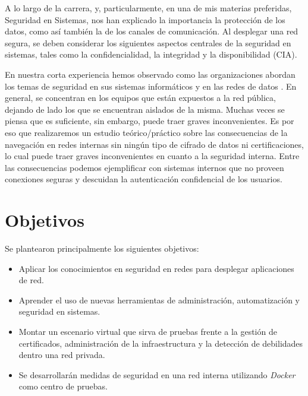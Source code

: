 %


A lo largo de la carrera, y, particularmente, en una de mis materias preferidas,  
Seguridad en Sistemas, nos han explicado la importancia la protección de los 
datos, como así también la de los canales de comunicación. Al desplegar 
una red segura, se deben considerar los siguientes aspectos centrales de la 
seguridad en sistemas, tales como la confidencialidad, la integridad y la disponibilidad 
(CIA). 

En nuestra corta experiencia hemos observado como las organizaciones 
abordan los temas de seguridad en sus sistemas informáticos y en las redes de 
datos . En general, se 
concentran en los equipos que están expuestos a la red pública, dejando de 
lado los que se encuentran aislados de la misma. Muchas veces 
se piensa que es suficiente, sin embargo, puede traer graves inconvenientes. 
Es por eso que realizaremos un estudio teórico/práctico sobre las consecuencias 
de la navegación en redes internas sin ningún tipo de cifrado de datos ni 
certificaciones, lo cual puede traer graves inconvenientes en cuanto a la 
seguridad interna. Entre las consecuencias podemos ejemplificar con sistemas 
internos que no proveen conexiones seguras y descuidan la autenticación 
confidencial de los usuarios.


\section{Objetivos}

\noindent Se plantearon principalmente los siguientes objetivos:
\begin{itemize}
    \setlength\itemsep{-0.6em}
    \item Aplicar los conocimientos en seguridad en redes para desplegar aplicaciones de red.
    \item Aprender el uso de nuevas herramientas de administración, automatización y seguridad en sistemas.
    \item Montar un escenario virtual que sirva de pruebas frente a la gestión de certificados, 
    administración de la infraestructura y la detección de debilidades dentro una red privada.
    \item Se desarrollarán medidas de seguridad en una red interna utilizando \emph{Docker} como centro de 
    pruebas.
\end{itemize}


